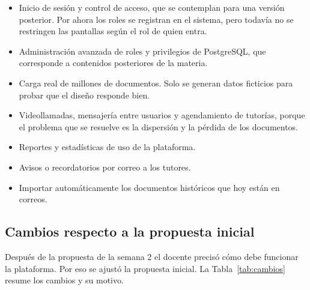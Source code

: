 \documentclass[12pt,a4paper,oneside]{article}
\begin{document}
\begin{itemize}[leftmargin=1.2cm]
  \item Inicio de sesión y control de acceso, que se contemplan para una versión posterior.
        Por ahora los roles se registran en el sistema, pero todavía no se restringen las
        pantallas según el rol de quien entra.
  \item Administración avanzada de roles y privilegios de PostgreSQL, que corresponde a
        contenidos posteriores de la materia.
  \item Carga real de millones de documentos. Solo se generan datos ficticios para
        probar que el diseño responde bien.
  \item Videollamadas, mensajería entre usuarios y agendamiento de tutorías, porque el
        problema que se resuelve es la dispersión y la pérdida de los documentos.
  \item Reportes y estadísticas de uso de la plataforma.
  \item Avisos o recordatorios por correo a los tutores.
  \item Importar automáticamente los documentos históricos que hoy están en correos.
\end{itemize}

\subsection{Cambios respecto a la propuesta inicial}

Después de la propuesta de la semana 2 el docente precisó cómo debe funcionar la
plataforma. Por eso se ajustó la propuesta inicial. La Tabla~\ref{tab:cambios} resume
los cambios y su motivo.
\end{document}
